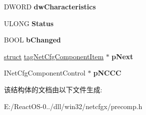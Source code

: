 \begin{DoxyCompactItemize}
D\+W\+O\+RD {\bfseries dw\+Characteristics}
\item 
\mbox{\label{structtag_net_cfg_component_item_a997068c1951099935e700bd3649eae68}} 
U\+L\+O\+NG {\bfseries Status}
\item 
\mbox{\label{structtag_net_cfg_component_item_a2a0d2cf9168853177bc893a104b7111a}} 
B\+O\+OL {\bfseries b\+Changed}
\item 
\mbox{\label{structtag_net_cfg_component_item_afa1aed432a95c2d8b785c2293fb5cacb}} 
\hyperlink{interfacestruct}{struct} \hyperlink{structtag_net_cfg_component_item}{tag\+Net\+Cfg\+Component\+Item} $\ast$ {\bfseries p\+Next}
\item 
\mbox{\label{structtag_net_cfg_component_item_a2ee930bf6c0ac7e89fa64ac4ff6b2ec2}} 
I\+Net\+Cfg\+Component\+Control $\ast$ {\bfseries p\+N\+C\+CC}
\end{DoxyCompactItemize}


该结构体的文档由以下文件生成\+:\begin{DoxyCompactItemize}
\item 
E\+:/\+React\+O\+S-\/0../dll/win32/netcfgx/precomp.\+h\end{DoxyCompactItemize}
